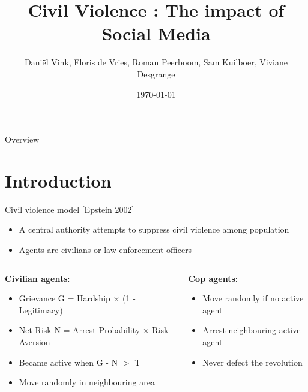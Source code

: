 \documentclass[10pt]{beamer}
\title[Kvam Presentation 1]{Civil Violence : The impact of Social Media}
\author{Daniël Vink, Floris de Vries, Roman Peerboom, Sam Kuilboer, Viviane Desgrange}
\institute{University of Amsterdam}
\date{\today}
\begin{document}
    \begin{frame}
        \titlepage
    \end{frame}


    \begin{frame}{Overview}
        \tableofcontents
    \end{frame}

    \section{Introduction}

    \begin{frame}{Civil violence model [Epstein 2002]}

        \begin{itemize}
            \item A central authority attempts to suppress civil violence among population
            \item Agents are civilians or law enforcement officers
        \end{itemize}

        \hfill
        \hfill

        \begin{columns}
            \begin{column}{.6\textwidth}
                \textbf{Civilian agents}:
                \begin{itemize}
                    \item Grievance G = Hardship $\times$ (1 - Legitimacy)
                    \item Net Risk N = Arrest Probability $\times$ Risk Aversion
                    \item Became active when G - N $>$ T
                    \item Move randomly in neighbouring area
                \end{itemize}
            \end{column}
            \begin{column}{.4\textwidth}
                \textbf{Cop agents}:
                \begin{itemize}
                    \item Move randomly if no active agent
                    \item Arrest neighbouring active agent
                    \item Never defect the revolution
                \end{itemize}
            \end{column}
        \end{columns}


\end{frame}
\end{document}
